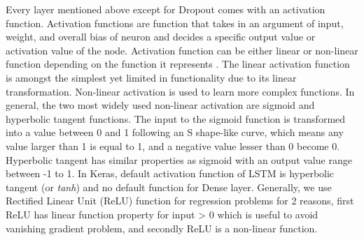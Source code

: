 Every layer mentioned above except for Dropout comes with an activation function. Activation functions are function that takes in an argument of input, weight, and overall bias of neuron and decides a specific output value or activation value of the node. Activation function can be either linear or non-linear function depending on the function it represents \cite{nwankpa2018activation}. The linear activation function is amongst the simplest yet limited in functionality due to its linear transformation. Non-linear activation is used to learn more complex functions. In general, the two most widely used non-linear activation are sigmoid and hyperbolic tangent functions. The input to the sigmoid function is transformed into a value between 0 and 1 following an S shape-like curve, which means any value larger than 1 is equal to 1, and a negative value lesser than 0 become 0. Hyperbolic tangent has similar properties as sigmoid with an output value range between -1 to 1. In Keras, default activation function of LSTM is hyperbolic tangent (or \emph{tanh}) and no default function for Dense layer. Generally, we use Rectified Linear Unit (ReLU) function for regression problems for 2 reasons, first ReLU has linear function property for input > 0 which is useful to avoid vanishing gradient problem, and secondly ReLU is a non-linear function.

